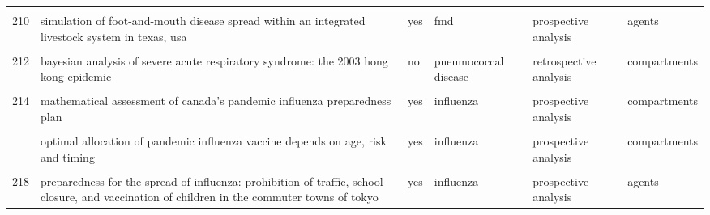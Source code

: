 \documentclass[
]{article}
\begin{document}
\begin{landscape}
\begin{longtable}{l>{\raggedright\arraybackslash}p{3.3cm}l>{\raggedright\arraybackslash}p{3.3cm}>{\raggedright\arraybackslash}p{2cm}l}
\cellcolor{gray!6}{209} & \cellcolor{gray!6}{seasonal transmission potential and activity peaks of the new influenza a(h1n1): a monte carlo likelihood analysis based on human mobility} & \cellcolor{gray!6}{not applicable} & \cellcolor{gray!6}{influenza} & \cellcolor{gray!6}{prospective analysis} & \cellcolor{gray!6}{compartments}\\
210 & simulation of foot-and-mouth disease spread within an integrated livestock system in texas, usa & yes & fmd & prospective analysis & agents\\
\addlinespace
\cellcolor{gray!6}{211} & \cellcolor{gray!6}{the transmissibility and control of pandemic influenza a (h1n1) virus} & \cellcolor{gray!6}{yes} & \cellcolor{gray!6}{influenza} & \cellcolor{gray!6}{prospective analysis} & \cellcolor{gray!6}{compartments}\\
212 & bayesian analysis of severe acute respiratory syndrome: the 2003 hong kong epidemic & no & pneumococcal disease & retrospective analysis & compartments\\
\cellcolor{gray!6}{213} & \cellcolor{gray!6}{hepatitis b vaccination and changes in sexual risk behaviour among men who have sex with men in amsterdam} & \cellcolor{gray!6}{yes} & \cellcolor{gray!6}{hepatitis b} & \cellcolor{gray!6}{retrospective analysis} & \cellcolor{gray!6}{compartments}\\
214 & mathematical assessment of canada's pandemic influenza preparedness plan & yes & influenza & prospective analysis & compartments\\
\cellcolor{gray!6}{215} & \cellcolor{gray!6}{modeling targeted layered containment of an influenza pandemic in the united states} & \cellcolor{gray!6}{yes} & \cellcolor{gray!6}{influenza} & \cellcolor{gray!6}{prospective analysis} & \cellcolor{gray!6}{agents}\\
\addlinespace
216 & optimal allocation of pandemic influenza vaccine depends on age, risk and timing & yes & influenza & prospective analysis & compartments\\
\cellcolor{gray!6}{217} & \cellcolor{gray!6}{pandemic simulation of antivirals plus school closures: buying time until strain-specific vaccine is available} & \cellcolor{gray!6}{yes} & \cellcolor{gray!6}{influenza pneumococcal disease} & \cellcolor{gray!6}{prospective analysis} & \cellcolor{gray!6}{agents}\\
218 & preparedness for the spread of influenza: prohibition of traffic, school closure, and vaccination of children in the commuter towns of tokyo & yes & influenza & prospective analysis & agents\\

\end{longtable}
\end{landscape}
\end{document}
